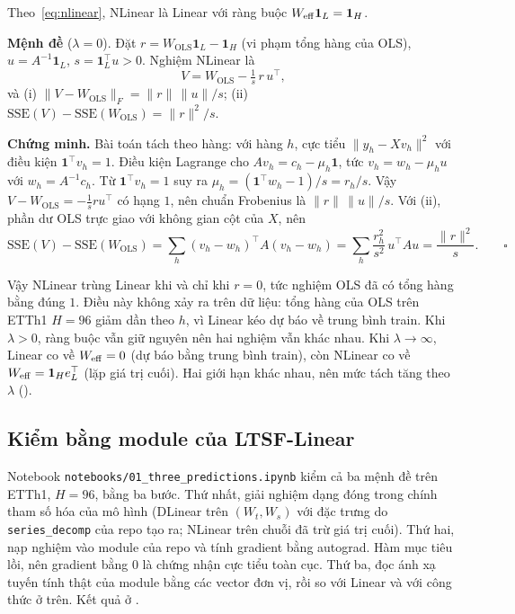 Theo~\eqref{eq:nlinear}, NLinear là Linear với ràng buộc $W_{\mathrm{eff}} \mathbf{1}_L = \mathbf{1}_H$.

\textbf{Mệnh đề} ($\lambda = 0$). Đặt $r = W_{\mathrm{OLS}} \mathbf{1}_L - \mathbf{1}_H$ (vi phạm tổng hàng của OLS), $u = A^{-1}\mathbf{1}_L$, $s = \mathbf{1}_L^\top u > 0$. Nghiệm NLinear là
\begin{equation}
    V = W_{\mathrm{OLS}} - \tfrac{1}{s}\, r\, u^\top,
\end{equation}
và (i) $\|V - W_{\mathrm{OLS}}\|_F = \|r\|\,\|u\| / s$; (ii) $\mathrm{SSE}(V) - \mathrm{SSE}(W_{\mathrm{OLS}}) = \|r\|^2 / s$.

\textbf{Chứng minh.} Bài toán tách theo hàng: với hàng $h$, cực tiểu $\|y_h - X v_h\|^2$ với điều kiện $\mathbf{1}^\top v_h = 1$. Điều kiện Lagrange cho $A v_h = c_h - \mu_h \mathbf{1}$, tức $v_h = w_h - \mu_h u$ với $w_h = A^{-1}c_h$. Từ $\mathbf{1}^\top v_h = 1$ suy ra $\mu_h = (\mathbf{1}^\top w_h - 1)/s = r_h / s$. Vậy $V - W_{\mathrm{OLS}} = -\tfrac1s r u^\top$ có hạng $1$, nên chuẩn Frobenius là $\|r\|\,\|u\|/s$. Với (ii), phần dư OLS trực giao với không gian cột của $X$, nên
\[
    \mathrm{SSE}(V) - \mathrm{SSE}(W_{\mathrm{OLS}}) = \sum_h (v_h - w_h)^\top A (v_h - w_h) = \sum_h \frac{r_h^2}{s^2}\, u^\top A u = \frac{\|r\|^2}{s}. \qquad \square
\]

Vậy NLinear trùng Linear khi và chỉ khi $r = 0$, tức nghiệm OLS đã có tổng hàng bằng đúng $1$. Điều này không xảy ra trên dữ liệu: tổng hàng của OLS trên ETTh1 $H = 96$ giảm dần theo $h$, vì Linear kéo dự báo về trung bình train. Khi $\lambda > 0$, ràng buộc vẫn giữ nguyên nên hai nghiệm vẫn khác nhau. Khi $\lambda \to \infty$, Linear co về $W_{\mathrm{eff}} = 0$ (dự báo bằng trung bình train), còn NLinear co về $W_{\mathrm{eff}} = \mathbf{1}_H e_L^\top$ (lặp giá trị cuối). Hai giới hạn khác nhau, nên mức tách tăng theo $\lambda$ ().

\subsection{Kiểm bằng module của LTSF-Linear}

Notebook \texttt{notebooks/01\_three\_predictions.ipynb} kiểm cả ba mệnh đề trên ETTh1, $H = 96$, bằng ba bước. Thứ nhất, giải nghiệm dạng đóng trong chính tham số hóa của mô hình (DLinear trên $(W_t, W_s)$ với đặc trưng do \texttt{series\_decomp} của repo tạo ra; NLinear trên chuỗi đã trừ giá trị cuối). Thứ hai, nạp nghiệm vào module của repo và tính gradient bằng autograd. Hàm mục tiêu lồi, nên gradient bằng $0$ là chứng nhận cực tiểu toàn cục. Thứ ba, đọc ánh xạ tuyến tính thật của module bằng các vector đơn vị, rồi so với Linear và với công thức ở trên. Kết quả ở .
